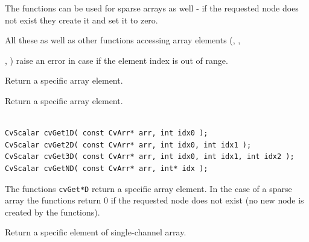 The functions can be used for sparse arrays as well - if the requested node does not exist they create it and set it to zero.

All these as well as other functions accessing array elements (, , 

, ) raise an error in case if the element index is out of range.


\ifplastex
{} 
 
 
Return a specific array element.

\else
{}\label{Get*D}

Return a specific array element.

\begin{lstlisting}

CvScalar cvGet1D( const CvArr* arr, int idx0 );
CvScalar cvGet2D( const CvArr* arr, int idx0, int idx1 );
CvScalar cvGet3D( const CvArr* arr, int idx0, int idx1, int idx2 );
CvScalar cvGetND( const CvArr* arr, int* idx );

\end{lstlisting}
\fi

\begin{description}
\end{description}


The functions \texttt{cvGet*D} return a specific array element. In the case of a sparse array the functions return 0 if the requested node does not exist (no new node is created by the functions).

\ifplastex
{} 
 
 
Return a specific element of single-channel array.

\else
{}\label{GetReal*D}

